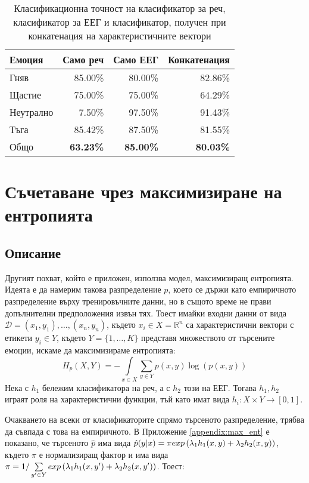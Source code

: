 \documentclass[main.tex]{subfiles}
\begin{document}
\begin{table}[h]
	\begin{center}
		\begin{tabular}{|l|r r r|}
			\hline
			Емоция    & Само реч         & Само ЕЕГ         & Конкатенация     \\
			\hline
			Гняв      & 85.00\%          & 80.00\%          & 82.86\%          \\
			Щастие    & 75.00\%          & 75.00\%          & 64.29\%          \\
			Неутрално & 7.50\%           & 97.50\%          & 91.43\%          \\
			Тъга      & 85.42\%          & 87.50\%          & 81.55\%          \\
			\hline
			\hline
			Общо      & \textbf{63.23\%} & \textbf{85.00\%} & \textbf{80.03\%} \\
			\hline
		\end{tabular}
		\caption{Класификационна точност на класификатор за реч, класификатор за ЕЕГ и класификатор, получен при конкатенация на характеристичните вектори}
		\label{tab:double:results:01}
	\end{center}
\end{table}

\section{Съчетаване чрез максимизиране на ентропията}
\subsection{Описание}
Другият похват, който е приложен, използва модел, максимизиращ ентропията. Идеята е да намерим такова разпределение $p$, което се държи като емпиричното разпределение върху тренировъчните данни, но в същото време не прави допълнителни предположения извън тях.
Тоест имайки входни данни от вида $\mathcal{D} = (x_1, y_1),\ldots, (x_n, y_n)$, където $x_i \in X = \mathbb{R}^n$ са характеристични вектори с етикети $y_i \in Y$, където $Y = \{1,\ldots, K\}$ представя множеството от търсените емоции, искаме да максимизираме ентропията:
\[
	H_p(X, Y) = - \int\limits_{x\in X} \sum\limits_{y \in Y} p(x, y) \log(p(x, y))
\]
Нека с $h_1$ бележим класификатора на реч, а с $h_2$ този на ЕЕГ. Тогава $h_1, h_2$ играят роля на характеристични функции, тъй като имат вида $h_i: X \times Y \to [0, 1]$.

Очакването на всеки от класификаторите спрямо търсеното разпределение, трябва да съвпада с това на емпиричното. В Приложение \autoref{appendix:max_ent} е показано, че търсеното $\hat{p}$ има вида $\hat{p}(y|x) = \pi exp\left(\lambda_1 h_1(x, y) + \lambda_2 h_2(x, y)\right)$,
където $\pi$ е нормализиращ фактор и има вида $\pi = 1/\sum\limits_{y' \in Y} exp\left(\lambda_1 h_1(x, y') + \lambda_2 h_2(x, y')\right)$. Тоест:
\end{document}
